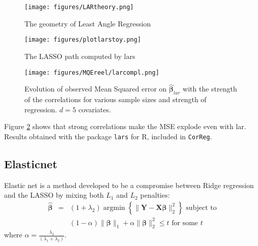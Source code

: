 \documentclass[12pt,a4paper]{report}
\begin{document}
\begin{figure}[h!]
	\centering
		  \texttt{[image: figures/LARtheory.png]}
		\caption{The geometry of Least Angle Regression}
	\end{figure}
				
\begin{figure}[h!]
	\centering
		  \texttt{[image: figures/plotlarstoy.png]}
		\caption{The LASSO path computed by lars}\label{plotlarstoy}
	\end{figure}			
	
		 \begin{figure}
	 \centering
	  \texttt{[image: figures/MQEreel/larcompl.png]}
	  \caption{Evolution of observed Mean Squared error on $\hat{\boldsymbol{\beta}}_{lar}$ with the strength of the correlations for various sample sizes and strength of regression. $d=5$ covariates. } \label{MQElarcompl}
	\end{figure}	
	 Figure \ref{MQElarcompl} shows that strong correlations make the MSE explode even with lar. Results obtained with the package {\tt lars} for R, included in {\tt CorReg}.
 	 
	 \FloatBarrier
		\subsection{Elasticnet}		%

			Elastic net \cite{zou2005regularization} is a method developed to be a compromise between Ridge regression and the \textsc{LASSO} by mixing both $L_1$ and $L_2$ penalties: 
	\begin{eqnarray}
		\boldsymbol{\hat{\beta}}&=&(1+\lambda_2) \operatorname{argmin}\left\lbrace \parallel \boldsymbol{Y}-\boldsymbol{X\beta} \parallel_2^2 \right\rbrace \textrm{ subject to} \nonumber \\
			 & &(1-\alpha)\parallel\boldsymbol{\beta}\parallel_1+\alpha\parallel\boldsymbol{\beta}\parallel_2^2\leq t \textrm{ for some } t
	\end{eqnarray}
	where $\alpha=\frac{\lambda_2}{(\lambda_1+\lambda_2)}$. 
	
\end{document}
